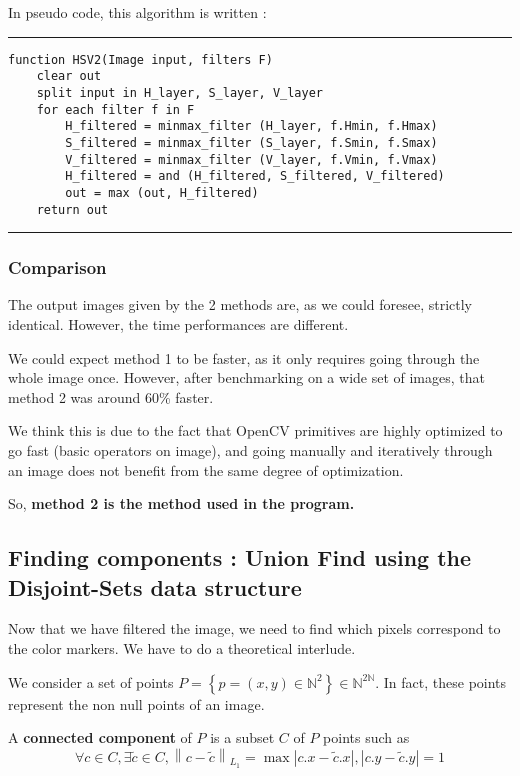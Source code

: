 \documentclass{article}
\newcommand{\N} {\mathbb N}
\newcommand{\norme}[1] {\left\| #1 \right\|}
\newcommand{\abs}[1] {\left| #1 \right|}
\begin{document}
In pseudo code, this algorithm is written :
\hrule
\begin{verbatim}
function HSV2(Image input, filters F)
    clear out
    split input in H_layer, S_layer, V_layer
    for each filter f in F
        H_filtered = minmax_filter (H_layer, f.Hmin, f.Hmax)
        S_filtered = minmax_filter (S_layer, f.Smin, f.Smax)
        V_filtered = minmax_filter (V_layer, f.Vmin, f.Vmax)
        H_filtered = and (H_filtered, S_filtered, V_filtered)
        out = max (out, H_filtered)
    return out
\end{verbatim}
\hrule\vspace*{.5 cm}

            \subsubsection{Comparison}

The output images given by the 2 methods are, as we could foresee, strictly identical.
However, the time performances are different.

We could expect method 1 to be faster, as it only requires going through the whole image once.
However, after benchmarking on a wide set of images, that method 2 was around 60\% faster.

We think this is due to the fact that OpenCV primitives are highly optimized to go fast
(basic operators on image), and going manually and iteratively through an image
does not benefit from the same degree of optimization.

So, \textbf{method 2 is the method used in the program.}

        \subsection{Finding components : Union Find using the Disjoint-Sets data structure}
\label{part_disjoint_sets}
Now that we have filtered the image, we need to find which pixels correspond to the color markers.
We have to do a theoretical interlude.

We consider a set of points $P = \left\{ p=(x, y) \in \N^2 \right\} \in \N^{2\N}$. In fact, these points represent the non null points of an image.

\label{def_connected_component}
A \textbf{connected component} of $P$ is a subset $C$ of $P$ points such as
$$\forall c \in C, \exists \tilde c \in C,
\norme{ c - \tilde c }_{L_1} =
\max{}{ \abs{c.x - \tilde c.x}, \abs{c.y - \tilde c.y} } = 1$$
\end{document}
